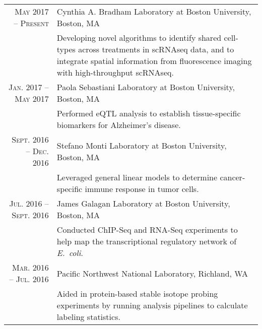 \documentclass[a4paper,10pt]{article}
\begin{document}
\section{\color{linkcolour}{Research}}
\begin{tabular}{rp{10cm}}
	\textsc{May 2017 -- Present}     & Cynthia A. Bradham Laboratory at Boston University, Boston, MA                               \\
	                                 & \footnotesize{Developing novel algorithms to identify shared cell-types across treatments
		in scRNAseq data, and to integrate spatial information from fluorescence
	imaging with high-throughput scRNAseq.}                                                                                         \\
	\textsc{Jan. 2017 -- May 2017}   & Paola Sebastiani Laboratory at Boston University, Boston, MA                                 \\
	                                 & \footnotesize{Performed eQTL analysis to establish tissue-specific biomarkers for
	Alzheimer's disease.}                                                                                                           \\
	\textsc{Sept. 2016 -- Dec. 2016} & Stefano Monti Laboratory at Boston University, Boston, MA                                    \\
	                                 & \footnotesize{Leveraged general linear models to determine cancer-specific immune response in
	tumor cells.}                                                                                                                   \\
	\textsc{Jul. 2016 -- Sept. 2016} & James Galagan Laboratory at Boston University, Boston, MA                                    \\
	                                 & \footnotesize{Conducted ChIP-Seq and RNA-Seq experiments to help map the transcriptional
	regulatory network of \emph{E.\ coli}.}                                                                                         \\
	\textsc{Mar. 2016 -- Jul. 2016}  & Pacific Northwest National Laboratory, Richland, WA                                          \\
	                                 & \footnotesize{Aided in protein-based stable isotope probing experiments by
	running analysis pipelines to  calculate labeling statistics.}                                                                  \\

\end{tabular}
\end{document}
